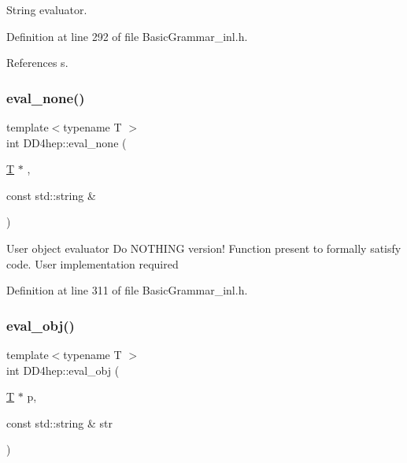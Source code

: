 String evaluator. 



Definition at line 292 of file Basic\+Grammar\+\_\+inl.\+h.



References s.

\hypertarget{namespace_d_d4hep_a89964a0dcd67c604186477ee53082e44}{}\label{namespace_d_d4hep_a89964a0dcd67c604186477ee53082e44} 
\subsubsection{\texorpdfstring{eval\+\_\+none()}{eval\_none()}}
{\footnotesize\ttfamily template$<$typename T $>$ \\
int D\+D4hep\+::eval\+\_\+none (\begin{DoxyParamCaption}\item[{\hyperlink{class_t}{T} $\ast$}]{,  }\item[{const std\+::string \&}]{ }\end{DoxyParamCaption})\hspace{0.3cm}{\ttfamily [inline]}}

User object evaluator Do N\+O\+T\+H\+I\+NG version! Function present to formally satisfy code. User implementation required 

Definition at line 311 of file Basic\+Grammar\+\_\+inl.\+h.

\hypertarget{namespace_d_d4hep_a1fda56a166c70d8a7b27ae08decf769d}{}\label{namespace_d_d4hep_a1fda56a166c70d8a7b27ae08decf769d} 
\subsubsection{\texorpdfstring{eval\+\_\+obj()}{eval\_obj()}}
{\footnotesize\ttfamily template$<$typename T $>$ \\
int D\+D4hep\+::eval\+\_\+obj (\begin{DoxyParamCaption}\item[{\hyperlink{class_t}{T} $\ast$}]{p,  }\item[{const std\+::string \&}]{str }\end{DoxyParamCaption})\hspace{0.3cm}{\ttfamily [inline]}}



